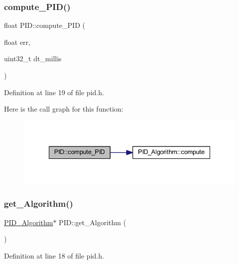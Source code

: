 \subsubsection{\texorpdfstring{compute\_PID()}{compute\_PID()}}
{\footnotesize\ttfamily float P\+I\+D\+::compute\+\_\+\+P\+ID (\begin{DoxyParamCaption}\item[{float}]{err,  }\item[{uint32\+\_\+t}]{dt\+\_\+millis }\end{DoxyParamCaption})\hspace{0.3cm}{\ttfamily [inline]}}



Definition at line 19 of file pid.\+h.

Here is the call graph for this function\+:
\nopagebreak
\begin{figure}[H]
\begin{center}
\leavevmode
\includegraphics[width=335pt]{class_p_i_d_a4d19abca579301069c3edb28fd5ff7f2_cgraph}
\end{center}
\end{figure}
\mbox{\label{class_p_i_d_a940bbf0c834f0ac68203b8e28b2ca8d1}} 
\subsubsection{\texorpdfstring{get\_Algorithm()}{get\_Algorithm()}}
{\footnotesize\ttfamily \mbox{\hyperlink{class_p_i_d___algorithm}{P\+I\+D\+\_\+\+Algorithm}}$\ast$ P\+I\+D\+::get\+\_\+\+Algorithm (\begin{DoxyParamCaption}{ }\end{DoxyParamCaption})\hspace{0.3cm}{\ttfamily [inline]}}



Definition at line 18 of file pid.\+h.

\mbox{\label{class_p_i_d_ac4ec6b4822395c58b0d50c0265b18369}} 
